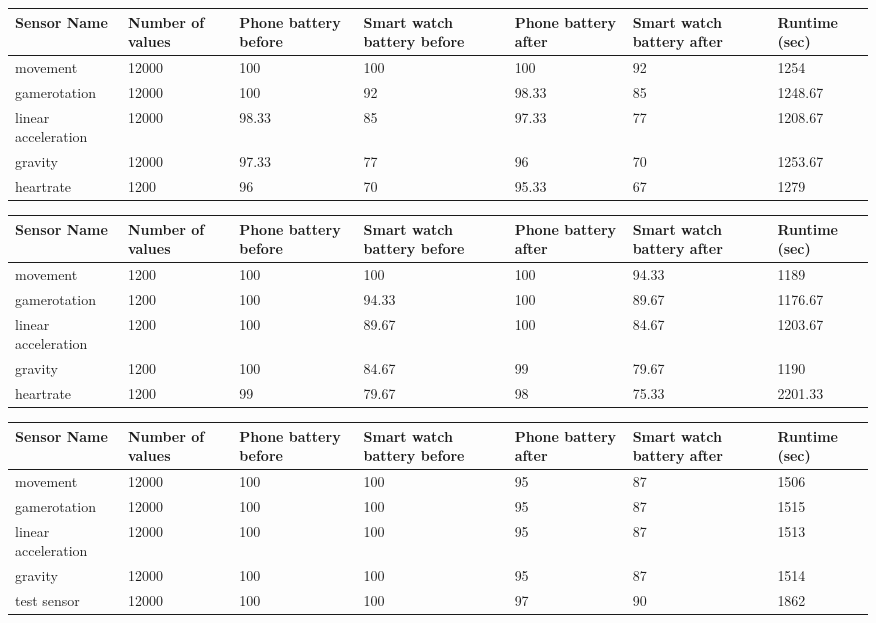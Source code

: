 \begin{center}
  \begin{tabular}{ |p{2.5cm}|p{1.5cm}|p{1.5cm}|p{1.5cm}|p{1.5cm}|p{1.5cm}|p{1.5cm}|}
  \hline
Sensor Name &Number of values &	Phone battery before &	Smart watch battery before &	Phone battery after	& Smart watch battery after &	Runtime (sec) \\
  \hline
movement 	& 12000	& 100	& 100	& 100	& 92	& 1254	 \\
gamerotation	& 12000& 	100	& 92	& 98.33	& 85	& 1248.67  \\
linear acceleration 	&  12000 &	98.33	& 85	& 97.33 	& 77 & 	1208.67\\ 
gravity 	&		12000	& 97.33& 	77	& 96	& 70	& 1253.67 \\
heartrate & 	1200	& 96	& 70 & 	95.33	& 67	& 1279 \\
  \hline
  \end{tabular}
       \label{tab:title3} 
\end{center}


\begin{center}
  \begin{tabular}{ |p{2.5cm}|p{1.5cm}|p{1.5cm}|p{1.5cm}|p{1.5cm}|p{1.5cm}|p{1.5cm}|}
  \hline
Sensor Name &Number of values &	Phone battery before &	Smart watch battery before &	Phone battery after	& Smart watch battery after &	Runtime (sec) \\
  \hline
movement 	& 	1200	& 100	& 100	& 100	& 94.33 & 	1189 \\
gamerotation	 &  1200	& 100	& 94.33	& 100	& 89.67	& 1176.67\\
linear acceleration 	& 1200	& 100	& 89.67	& 100	& 84.67	& 1203.67 \\ 
gravity 	&		1200	& 100	& 84.67	& 99	& 79.67	& 1190 \\
heartrate & 	 1200	& 99	& 79.67	& 98	& 75.33	& 2201.33\\
  \hline
  \end{tabular}
         \label{tab:title4} 
\end{center}

\begin{center}
  \begin{tabular}{ |p{3cm}|p{1.5cm}|p{1.5cm}|p{1.5cm}|p{1.5cm}|p{1.5cm}|p{1.5cm}|}
  \hline
Sensor Name &Number of values &	Phone battery before &	Smart watch battery before &	Phone battery after	& Smart watch battery after &	Runtime (sec) \\
  \hline
movement 	& 	12000 & 	100 & 	100	& 95	& 87	& 1506 \\
gamerotation	 & 12000 & 100	& 100	& 95	& 87	& 1515  \\
linear acceleration 	& 12000	& 100	& 100	& 95	& 87	& 1513 \\ 
gravity 	&		12000	& 100	& 100	& 95	& 87	& 1514 \\
test sensor & 	12000	& 100	& 100	& 97	& 90	& 1862 \\
  \hline
  \end{tabular}
           \label{tab:title5} 
\end{center}


